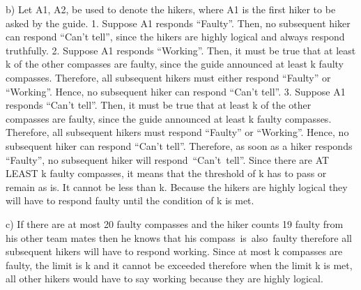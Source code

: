 \documentclass[a4paper]{exam}
\begin{document}
\begin{questions}
\begin{solution}
    b) Let A1, A2, be used to denote the hikers, where A1 is the first hiker to be asked by the guide.
    1. Suppose A1 responds “Faulty”. Then, no subsequent hiker can respond “Can’t tell”, since the hikers are highly logical and always respond truthfully. 
    2. Suppose A1 responds “Working”. Then, it must be true that at least k of the other compasses are faulty, since the guide announced at least k faulty compasses. Therefore, all subsequent hikers must either respond “Faulty” or “Working”. Hence, no subsequent hiker can respond “Can’t tell”. 
    3. Suppose A1 responds “Can’t tell”. Then, it must be true that at least k of the other compasses are faulty, since the guide announced at least k faulty compasses. Therefore, all subsequent hikers must respond “Faulty” or “Working”. Hence, no subsequent hiker can respond “Can’t tell”. Therefore, as soon as a hiker responds “Faulty”, no subsequent hiker will respond “Can’t tell”.
    Since there are AT LEAST k faulty compasses, it means that the threshold of k has to pass or remain as is. It cannot be less than k. Because the hikers are highly logical they will have to respond faulty until the condition of k is met.
    
    c) If there are at most 20 faulty compasses and the hiker counts 19 faulty from his other team mates then he knows that his compass is also faulty therefore all subsequent hikers will have to respond working. Since at most k compasses are faulty, the limit is k and it cannot be exceeded therefore when the limit k is met, all other hikers would have to say working because they are highly logical.
  \end{solution}
\end{questions}
\end{document}
